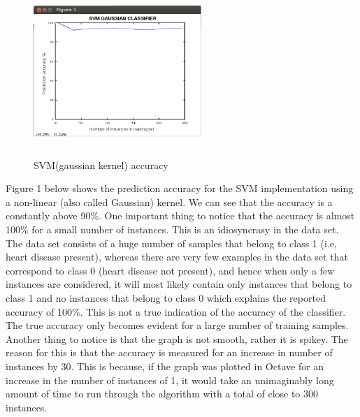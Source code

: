 \documentclass{acm_proc_article-sp}
\begin{document}
\begin{figure}
\centering
\includegraphics[width=2.5in, height=2.5in]{svmg.png}
\caption{SVM(gaussian kernel) accuracy}
\end{figure}
Figure 1 below shows the prediction accuracy for the SVM implementation using a non-linear (also called Gaussian) kernel. We can see that the accuracy is a constantly above 90\%. One important thing to notice that the accuracy is almost 100\% for a small number of instances. This is an idiosyncrasy in the data set. The data set consists of a huge number of samples that belong to class 1 (i.e, heart disease present), whereas there are very few examples in the data set that correspond to class 0 (heart disease not present), and hence when only a few instances are considered, it will most likely contain only instances that belong to class 1 and no instances that belong to class 0 which explains the reported accuracy of 100\%. This is not a true indication of the accuracy of the classifier. The true accuracy only becomes evident for a large number of training samples. Another thing to notice is that the graph is not smooth, rather it is spikey. The reason for this is that the accuracy is measured for an increase in number of instances by 30. This is because, if the graph was plotted in Octave for an increase in the number of instances of 1, it would take an unimaginably long amount of time to run through the algorithm with a total of close to 300 instances.
\end{document}
